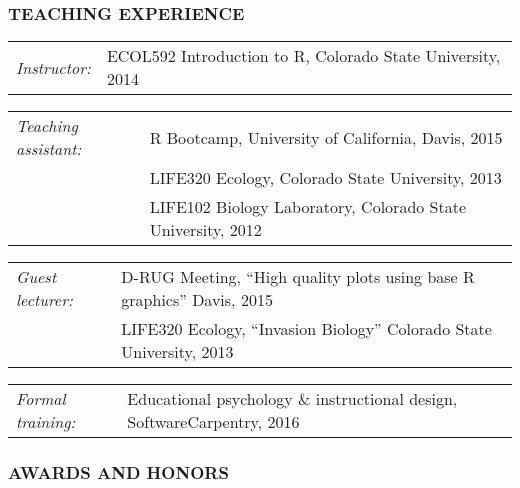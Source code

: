 \documentclass[11pt,english]{article}
\providecommand{\tabularnewline}{\\}
\begin{document}

\subsubsection*{TEACHING EXPERIENCE}
\vspace{-0.5ex}

\begin{hangparas}{.25in}{1}

\begin{tabular}{>{\raggedright}p{1.26in}>{\raggedright}p{4.75in}}
\emph{Instructor:} & ECOL592 Introduction to R, Colorado State University, 2014
\end{tabular}

\begin{tabular}{>{\raggedright}p{1.26in}>{\raggedright}p{4.75in}}
\emph{Teaching assistant:} & R Bootcamp, University of California, Davis, 2015 \tabularnewline
& LIFE320 Ecology, Colorado State University, 2013 \tabularnewline 
& LIFE102 Biology Laboratory, Colorado State University, 2012 \tabularnewline
\end{tabular}

\begin{tabular}{>{\raggedright}p{1.26in}>{\raggedright}p{4.75in}}
\emph{Guest lecturer:} & D-RUG Meeting, ``High quality plots using base R graphics'' Davis, 2015 \tabularnewline
& LIFE320 Ecology, ``Invasion Biology'' Colorado State University, 2013
\end{tabular}

\begin{tabular}{>{\raggedright}p{1.26in}>{\raggedright}p{4.75in}}
\emph{Formal training:} & Educational psychology \& instructional design, SoftwareCarpentry, 2016
\end{tabular}

\end{hangparas}
\vspace{1ex}



\subsubsection*{AWARDS AND HONORS}
\vspace{-0.5ex}

\end{document}
